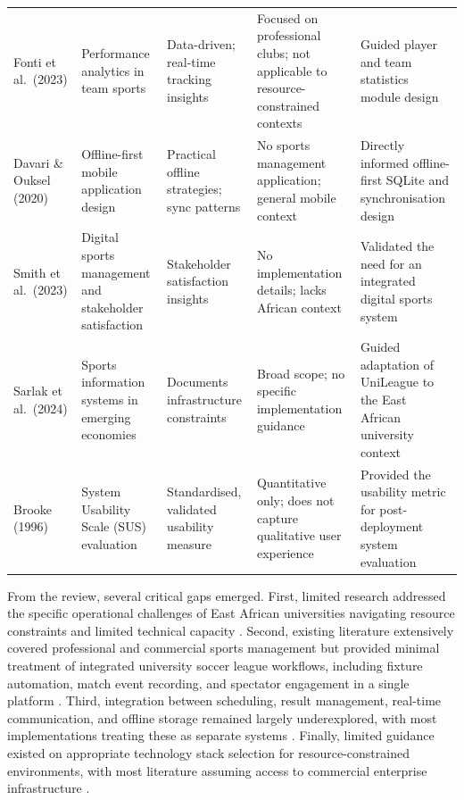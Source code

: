\documentclass[12pt,a4paper]{report}
\begin{document}
\begin{longtable}{p{2.4cm}p{3.0cm}p{2.8cm}p{3.2cm}p{2.8cm}}
Fonti et al.\ (2023) \cite{fonti2023} &
Performance analytics in team sports &
Data-driven; real-time tracking insights &
Focused on professional clubs; not applicable to resource-constrained contexts &
Guided player and team statistics module design \\[4pt]

Davari \& Ouksel (2020) \cite{davari2020} &
Offline-first mobile application design &
Practical offline strategies; sync patterns &
No sports management application; general mobile context &
Directly informed offline-first SQLite and synchronisation design \\[4pt]

Smith et al.\ (2023) \cite{smith2023} &
Digital sports management and stakeholder satisfaction &
Stakeholder satisfaction insights &
No implementation details; lacks African context &
Validated the need for an integrated digital sports system \\[4pt]

Sarlak et al.\ (2024) \cite{sarlak2024} &
Sports information systems in emerging economies &
Documents infrastructure constraints &
Broad scope; no specific implementation guidance &
Guided adaptation of UniLeague to the East African university context \\[4pt]

Brooke (1996) \cite{brooke1996} &
System Usability Scale (SUS) evaluation &
Standardised, validated usability measure &
Quantitative only; does not capture qualitative user experience &
Provided the usability metric for post-deployment system evaluation \\[4pt]

\end{longtable}

From the review, several critical gaps emerged. First, limited research addressed the
specific operational challenges of East African universities navigating resource constraints
and limited technical capacity \cite{sarlak2024}. Second, existing literature extensively
covered professional and commercial sports management but provided minimal treatment of
integrated university soccer league workflows, including fixture automation, match event
recording, and spectator engagement in a single platform \cite{vanbulck2022}. Third,
integration between scheduling, result management, real-time communication, and offline
storage remained largely underexplored, with most implementations treating these as separate
systems \cite{davari2020}. Finally, limited guidance existed on appropriate technology stack
selection for resource-constrained environments, with most literature assuming access to
commercial enterprise infrastructure \cite{fonti2023}.
\end{document}
